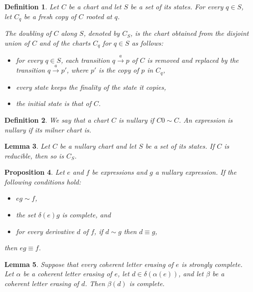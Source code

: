 \documentclass{article}
\newtheorem{definition}{Definition}[section]
\newtheorem{lemma}[definition]{Lemma}
\newtheorem{proposition}[definition]{Proposition}
\newcommand{\doubling}[2]{#1_{#2}}
\begin{document}
\begin{definition}\label{def:doubling}
  Let $C$ be a chart and let $S$ be a set of its states. For
  every $q\in S$, let $C_q$ be a fresh copy of $C$ rooted at $q$.
  \medskip

  The \emph{doubling of $C$ along $S$}, denoted by $\doubling{C}{S}$, is the
  chart obtained from the disjoint union of $C$ and of the charts $C_q$ for $q\in S$ as follows:
  \begin{itemize}
    \item for every $q\in S$, each transition $q\xrightarrow{a}p$ of
    $C$ is removed and replaced by the transition $q\xrightarrow{a}p'$, where $p'$ is the copy of $p$ in $C_q$,
    \item every state keeps the finality of the state it copies,
    \item the initial state is that of $C$.
  \end{itemize}
\end{definition}

\begin{definition}
We say that a chart $C$ is \emph{nullary} if $C0\sim C$.
An expression is \emph{nullary} if its milner chart is.
\end{definition}

\begin{lemma}\label{lem:doubling-reducible}
  Let $C$ be a nullary chart  and let $S$ be a set of its states. If $C$ is reducible, then so is 
  $\doubling{C}{S}$.
\end{lemma}



\begin{proposition}\label{prop:complete-bisim-arity-zero} Let $e$ and $f$ be expressions and $g$ a nullary expression.
  If the following conditions hold:
  \begin{itemize}
    \item  $eg \sim f$,
    \item the set $\delta(e)g$ is complete, and
    \item for every derivative $d$ of $f$, if $d\sim g$ then
    $d\equiv g$,
  \end{itemize}
    then $eg \equiv f$.
  \end{proposition}
  


\begin{lemma}\label{lem:erased-derivative-complete}
  Suppose that every coherent letter erasing of $e$ is strongly complete.
  Let $\alpha$ be a coherent letter erasing of $e$, let
  $d\in\delta(\alpha(e))$, and let $\beta$ be a coherent letter erasing of
  $d$. Then $\beta(d)$ is complete.
\end{lemma}
\end{document}
